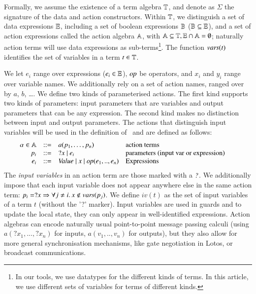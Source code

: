 \documentclass{elsarticle}
\newcommand{\TODO}[1]{\textcolor{red}{\textbf{[TODO:#1]}}}
\begin{document}

Formally, we assume the existence of a term algebra $\mathbb{T}$,
and denote as $\Sigma$ the signature of the data and action constructors. Within $\mathbb{T}$, we distinguish a set of
data expressions $\mathbb{E}$, including a set of boolean
expressions $\mathbb{B}$ ($\mathbb{B}\subseteq\mathbb{E}$), 
and a set of action expressions  called the action algebra
$\mathbb{A}$, with $\mathbb{A}\subseteq\mathbb{T},
\mathbb{E}\cap\mathbb{A}=\emptyset$;
naturally action terms will use data expressions as sub-terms\footnote{In our tools, we use datatypes for the different kinds of terms. In this article, we use different sets of variables for  terms of different kinds.}.
The function $\vars(t)$ identifies the set of variables in a term
$t\in\mathbb{T}$.


We let $e_i$ range over expressions ($e_i\in\mathbb{E}$), $\symb{op}$ be operators, and $x_i$ and $y_i$ range over
variable names.  We additionally rely on a set of action names, ranged over by $a$, $b$, \ldots. 
We define two kinds of parameterised actions. The first kind supports two kinds of parameters: input parameters that are variables and output parameters that can be any expression. The second kind makes no distinction between input and output parameters. 
The  actions that distinguish input variables will be used in the definition of \pLTS\  and are defined as follows:
\[
\begin{array}[l]{rcl@{\quad}p{5.65cm}}
  \alpha\in\AlgA&::=&a(p_1,\ldots,p_n)&\text{action terms}\\
  p_i&::=& ?x~|~e_i&\text{parameters (input var or expression)}\\
  e_i&::=& \symb{Value}~|~x~|~\symb{op}(\symb{e}_1,..,\symb{e}_n)&\text{Expressions}
\end{array}
\]
The \emph{input variables} in an action term are those marked with a
$\symb{?}$.
We additionally impose that each input variable does not
appear anywhere else in the same action term:
$p_i=?x\Rightarrow\forall j\neq i.\, x\notin \vars(p_j)$.
We define $iv(t)$  as the set of input variables of a term $t$ (without the '?' marker).
Input variables are used in guards and to update the local state, they can only appear in well-identified expressions.
Action algebras can encode naturally usual point-to-point message passing calculi (using 
$a(?x_1,...,?x_n)$ for inputs, $a(v_1,..,v_n)$ for outputs), but they also allow
for more general synchronisation mechanisms, like gate negotiation in Lotos, or broadcast
communications. 
\end{document}
